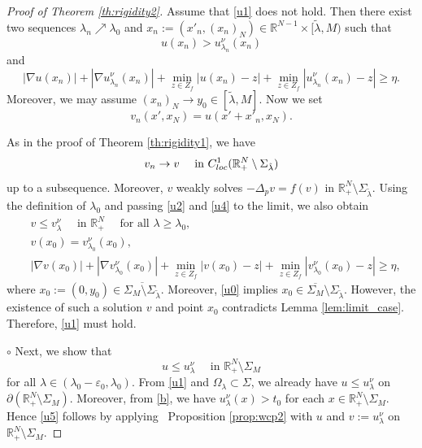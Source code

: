 \documentclass[reqno]{amsart}
\theoremstyle{plain}
\theoremstyle{definition}
\theoremstyle{remark}
\begin{document}
\begin{proof}[Proof of Theorem \ref{th:rigidity2}]
		Assume that \eqref{u1} does not hold. Then there exist two sequences $\lambda_n \nearrow \lambda_0$ and $x_n := (x'_n, (x_n)_N) \in \mathbb{R}^{N-1} \times [\tilde{\lambda},M)$ such that
		\begin{equation}\label{u2}
			u(x_n) > u_{\lambda_n}^\nu(x_n)
		\end{equation}
		and
		\begin{equation}\label{u4}
			|\nabla u(x_n)| + |\nabla u_{\lambda_n}^\nu(x_n)| + \min_{z\in Z_f}|u(x_n)-z| + \min_{z\in Z_f}|u_{\lambda_n}^\nu(x_n)-z| \ge \eta.
		\end{equation}
		Moreover, we may assume $(x_n)_N \to y_0 \in [\tilde{\lambda},M]$. Now we set
		\[
		v_n(x', x_N) = u(x'+x'_n, x_N).
		\]
		
		As in the proof of Theorem \ref{th:rigidity1}, we have
		\[
		v_n \to v \quad\text{ in } C^1_{\rm loc}(\mathbb{R}^N_+\setminus\Sigma_{\tilde{\lambda}})
		\]
		up to a subsequence. Moreover, $v$ weakly solves $-\Delta_p v = f(v)$ in $\mathbb{R}^N_+\setminus\Sigma_{\tilde{\lambda}}$.
		Using the definition of $\lambda_0$ and passing \eqref{u2} and \eqref{u4} to the limit, we also obtain
		\begin{align*}
			&v \le v_\lambda^\nu \quad\text{ in } \mathbb{R}^N_+ \quad\text{ for all } \lambda \ge \lambda_0,\\
			&v(x_0) = v_{\lambda_0}^\nu(x_0),\\
			&|\nabla v(x_0)| + |\nabla v_{\lambda_0}^\nu(x_0)| + \min_{z\in Z_f}|v(x_0)-z| + \min_{z\in Z_f}|v_{\lambda_0}^\nu(x_0)-z| \ge \eta,
		\end{align*}
		where $x_0 := (0,y_0) \in\overline{\Sigma_M\setminus\Sigma_{\tilde{\lambda}}}$. Moreover, \eqref{u0} implies $x_0 \in \overline{\Sigma_M}\setminus\Sigma_{\tilde{\lambda}}$. However, the existence of such a solution $v$ and point $x_0$ contradicts Lemma \ref{lem:limit_case}.		
		Therefore, \eqref{u1} must hold.
		
		$\circ$ Next, we show that
		\begin{equation}\label{u5}
			u \le u_\lambda^\nu \quad\text{ in } \mathbb{R}^N_+\setminus\Sigma_M
		\end{equation}
		for all $\lambda \in (\lambda_0-\varepsilon_0, \lambda_0)$.
		From \eqref{u1} and $\Omega_\lambda\subset\Sigma$, we already have $u \le u_\lambda^\nu$ on $\partial (\mathbb{R}^N_+\setminus\Sigma_M )$. Moreover, from \eqref{b}, we have $u_\lambda^\nu(x) > t_0$ for each $x\in\mathbb{R}^N_+\setminus\Sigma_M$. Hence \eqref{u5} follows by applying  Proposition \ref{prop:wcp2} with $u$ and $v:=u_\lambda^\nu$ on $\mathbb{R}^N_+\setminus\Sigma_M$.
		

\end{proof}
\end{document}

